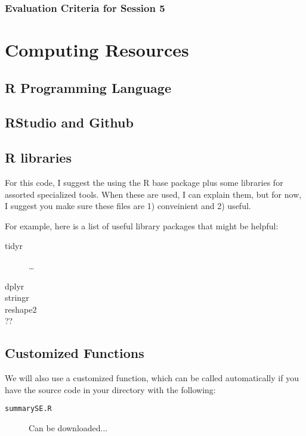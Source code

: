 \documentclass{article}\usepackage[]{graphicx}\usepackage[]{color}
\begin{document}
\subsubsection{Evaluation Criteria for Session 5}



\section{Computing Resources}

\subsection{R Programming Language}

\subsection{RStudio and Github}

\subsection{R libraries}

For this code, I suggest the using the R base package plus some libraries for assorted specialized tools. When these are used, I can explain them, but for now, I suggest you make sure these files are 1) conveinient and 2) useful. 

For example, here is a list of useful library packages that might be helpful:

\begin{description}
  \item[tidyr] \ldots
  \item[dplyr]
  \item[stringr]
  \item[reshape2]
  \item[??]
\end{description}

\subsection{Customized Functions}

We will also use a customized function, which can be called automatically if you have the source code in your directory with the following: 
\begin{description}
  \item[\texttt{summarySE.R}] Can be downloaded...
\end{description}
\end{document}
